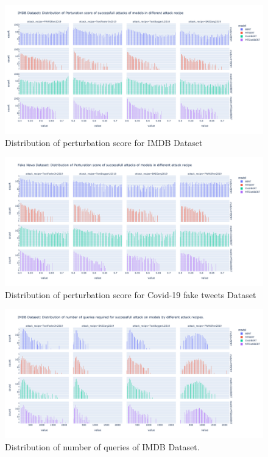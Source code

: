 \documentclass[%
	BCOR=8mm, %
	DIV=12,
	toc=bibliography, %
	toc=listof, %
	oneside, %
	egregdoesnotlikesansseriftitles, %
	]{scrbook}
\begin{document}
\begin{figure}[H]
    \centering
    \includegraphics[width=1.1\linewidth]{img/PertScoreDist_IMDB.png}
    \caption[Distribution of perturbation score for IMDB Dataset]{Distribution of perturbation score for IMDB Dataset}
    \label{fig:PerturbationScore_Dist_IMDB}
\end{figure}
\begin{figure}[H]
    \centering
    \includegraphics[width=1.1\linewidth]{img/PertScoreDist_fakenews.png}
    \caption[Distribution of perturbation score for Covid-19 fake tweets Dataset]{Distribution of perturbation score for Covid-19 fake tweets Dataset}
    \label{fig:PerturbationScore_Dist_fakenews}
\end{figure}
\begin{figure}[H]
    \centering
    \includegraphics[width=1.1\linewidth]{img/NumQueriesDist_IMDB.png}
    \caption[Distribution of number of queries of IMDB Dataset]{Distribution of number of queries of  IMDB Dataset.}
    \label{fig:Queries_distribution_imdb}
\end{figure}
\end{document}

